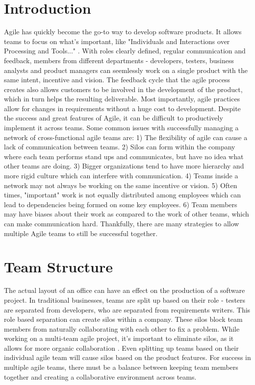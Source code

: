 \documentclass[sigplan,screen]{acmart}
\begin{document}
\section{Introduction}
Agile has quickly become the go-to way to develop software products.
It allows teams to focus on what's important, like "Individuals and Interactions over Processing and Tools..." \cite{b3}. 
With roles clearly defined, regular communication and feedback, members from different departments - developers, testers, business analysts and product managers can seemlessly work on a single product with the same intent, incentive and vision.
The feedback cycle that the agile process creates also allows customers to be involved in the development of the product, which in turn helps the resulting deliverable.
Most importantly, agile practices allow for changes in requirements without a huge cost to development.
Despite the success and great features of Agile, it can be difficult to productively implement it across teams.
Some common issues with successfully managing a network of cross-functional agile teams are: 
1) The flexibility of agile can cause a lack of communication between teams. 2) Silos can form within the company where each team performs stand ups and communicates, but have no idea what other teams are doing.
3) Bigger organizations tend to have more hierarchy and more rigid culture which can interfere with communication. 4) Teams inside a network may not always be working on the same incentive or vision. 5) Often times, "important" work is not equally distributed among employees which can lead to dependencies being formed on some key employees.
6) Team members may have biases about their work as compared to the work of other teams, which can make communication hard.
Thankfully, there are many strategies to allow multiple Agile teams to still be successful together.

\section{Team Structure}
The actual layout of an office can have an effect on the production of a software project.
In traditional businesses, teams are split up based on their role - testers are separated from developers, who are separated from requirements writers.
This role based separation can create silos within a company. 
These silos block team members from naturally collaborating with each other to fix a problem.
While working on a multi-team agile project, it's important to eliminate silos, as it allows for more organic collaboration \cite{b1}.
Even splitting up teams based on their individual agile team will cause silos based on the product features.
For success in multiple agile teams, there must be a balance between keeping team members together and creating a collaborative environment across teams.
\end{document}
